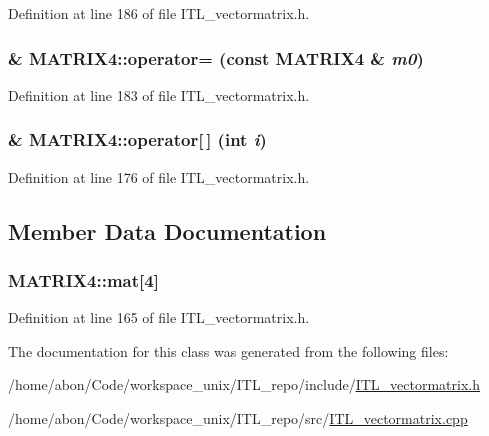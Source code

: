 Definition at line 186 of file ITL\_\-vectormatrix.h.

\hypertarget{classMATRIX4_a74b1f4b9862b324d0bf3841ac4dbbfbe}{
\subsubsection[{operator=}]{\& MATRIX4::operator= (const {\bf MATRIX4} \& {\em m0})}}
\label{classMATRIX4_a74b1f4b9862b324d0bf3841ac4dbbfbe}


Definition at line 183 of file ITL\_\-vectormatrix.h.

\hypertarget{classMATRIX4_ab266bb9fde86ff7085abb57bd7acbc25}{
\subsubsection[{operator[]}]{\& MATRIX4::operator\mbox{[}$\,$\mbox{]} (int {\em i})}}
\label{classMATRIX4_ab266bb9fde86ff7085abb57bd7acbc25}


Definition at line 176 of file ITL\_\-vectormatrix.h.



\subsection{Member Data Documentation}
\hypertarget{classMATRIX4_ac593e924265eb8846b77402f46ee82dd}{
\subsubsection[{mat}]{ {\bf MATRIX4::mat}\mbox{[}4\mbox{]}}}
\label{classMATRIX4_ac593e924265eb8846b77402f46ee82dd}


Definition at line 165 of file ITL\_\-vectormatrix.h.



The documentation for this class was generated from the following files:\begin{DoxyCompactItemize}
\item 
/home/abon/Code/workspace\_\-unix/ITL\_\-repo/include/\hyperlink{ITL__vectormatrix_8h}{ITL\_\-vectormatrix.h}\item 
/home/abon/Code/workspace\_\-unix/ITL\_\-repo/src/\hyperlink{ITL__vectormatrix_8cpp}{ITL\_\-vectormatrix.cpp}\end{DoxyCompactItemize}
